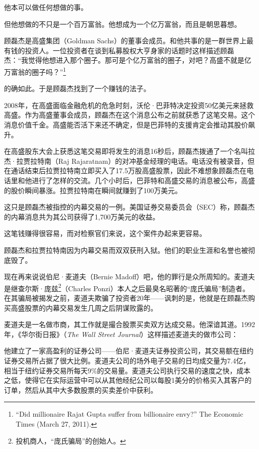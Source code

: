 他本可以做任何想做的事。

但他想做的不只是一个百万富翁。他想成为一个亿万富翁，而且是朝思暮想。

顾磊杰是高盛集团（Goldman Sachs）的董事会成员。和他共事的是一群世界上最有钱的投资人。一位投资者在谈到私募股权大亨身家的话题时这样描述顾磊杰：“我觉得他想进入那个圈子。那可是个亿万富翁的圈子，对吧？高盛不就是亿万富翁的圈子吗？”\footnote{“Did millionaire Rajat Gupta suffer from billionaire envy?” The Economic Times (March 27, 2011).}

的确如此。于是顾磊杰找到了一个赚钱的法子。

2008年，在高盛面临金融危机的危急时刻，沃伦·巴菲特决定投资50亿美元来拯救高盛。作为高盛董事会成员，顾磊杰在这个消息公布之前就获悉了这笔交易。这个消息价值千金。高盛能否活下来还不确定，但是巴菲特的支援肯定会推动其股价飙升。

在高盛股东大会上获悉这笔交易即将发生的消息16秒后，顾磊杰拨通了一个名叫拉杰·拉贾拉特南（Raj Rajaratnam）的对冲基金经理的电话。电话没有被录音，但在通话结束后拉贾拉特南立即买入了17.5万股高盛股票，因此不难想象顾磊杰在电话里和他进行了怎样的交流。几个小时后，巴菲特和高盛交易的消息被公布，高盛的股价瞬间暴涨。拉贾拉特南在瞬间就赚到了100万美元。

这只是顾磊杰被指控的内幕交易的一例。美国证券交易委员会（SEC）称，顾磊杰的内幕消息共为其公司获得了1,700万美元的收益。

这笔钱赚得很容易，而对检察官们来说，这个案件办起来更容易。

顾磊杰和拉贾拉特南因为内幕交易而双双获刑入狱。他们的职业生涯和名誉也被彻底毁了。

现在再来说说伯尼·麦道夫（Bernie Madoff）吧，他的罪行是众所周知的。麦道夫是继查尔斯·庞兹\footnote{投机商人，“庞氏骗局”的创始人。}（Charles Ponzi）本人之后最臭名昭著的“庞氏骗局”制造者。在其骗局被揭发之前，麦道夫欺骗了投资者20年——讽刺的是，他就是在顾磊杰购买高盛股票的内幕交易发生几周之后阴谋败露的。

麦道夫是一名做市商，其工作就是撮合股票买卖双方达成交易。他深谙其道。1992年，《华尔街日报》（\textit{The Wall Street Journal}）这样描述麦道夫的做市公司：

{\kaishu

他建立了一家高盈利的证券公司——伯尼·麦道夫证券投资公司，其交易额在纽约证券交易所占据了很大比例。麦道夫公司的场外电子交易的日均成交量为7.4亿，相当于纽约证券交易所每天9\%的交易量。麦道夫公司执行交易的速度之快，成本之低，使得它在实际运营中可以从其他经纪公司以每股1美分的价格买入其客户的订单，然后从其中大多数股票的买卖差价中获利。

}

